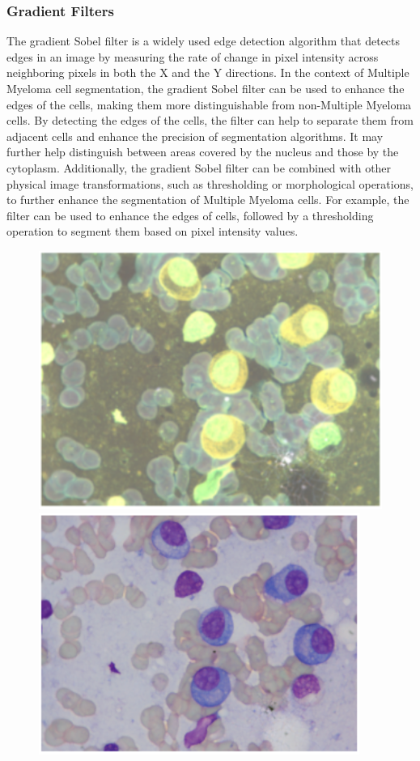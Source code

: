 \documentclass{article}
\begin{document}
\subsubsection{Gradient Filters}

The gradient Sobel filter is a widely used edge detection algorithm that detects edges in an image by measuring the rate of change in pixel intensity across neighboring pixels in both the X and the Y directions. In the context of Multiple Myeloma cell segmentation, the gradient Sobel filter can be used to enhance the edges of the cells, making them more distinguishable from non-Multiple Myeloma cells. By detecting the edges of the cells, the filter can help to separate them from adjacent cells and enhance the precision of segmentation algorithms. It may further help distinguish between areas covered by the nucleus and those by the cytoplasm. Additionally, the gradient Sobel filter can be combined with other physical image transformations, such as thresholding or morphological operations, to further enhance the segmentation of Multiple Myeloma cells. For example, the filter can be used to enhance the edges of cells, followed by a thresholding operation to segment them based on pixel intensity values.

\begin{figure}
  \centering
  \begin{minipage}{.5\textwidth}
    \centering
    \includegraphics[width=.4\linewidth]{3.png}
  \end{minipage}%
  \begin{minipage}{.4\textwidth}
    \centering
    \includegraphics[width=.6\linewidth]{4.png}
  \end{minipage}
\end{figure}
\end{document}
